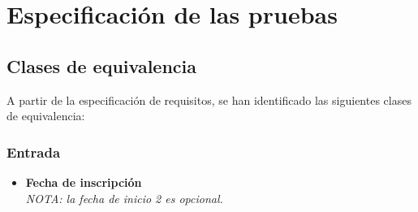 \chapter{Especificación de las pruebas}

\section{Clases de equivalencia}
A partir de la especificación de requisitos, se han identificado las siguientes clases de equivalencia:

\subsection{Entrada}
\begin{itemize}
	\item \textbf{Fecha de inscripción}
		\\\textit{NOTA: la fecha de inicio 2 es opcional.}


\end{itemize}
